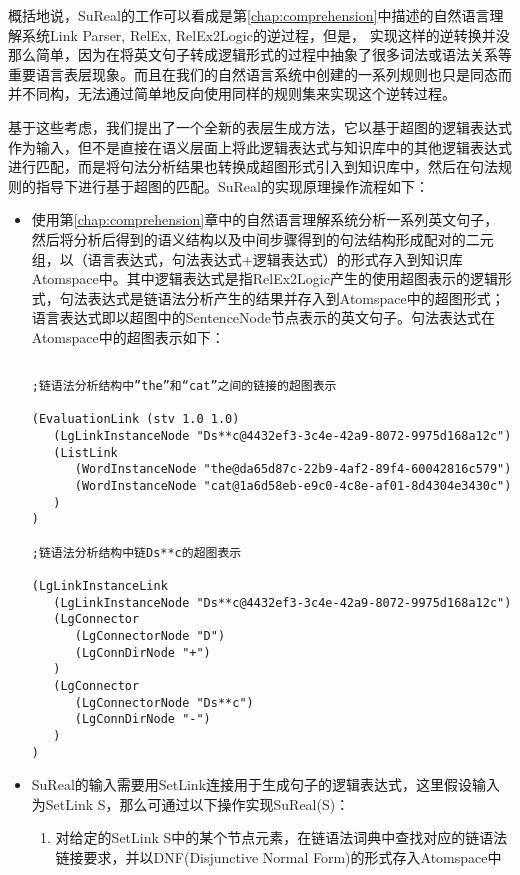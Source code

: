 概括地说，SuReal的工作可以看成是第\ref{chap:comprehension}中描述的自然语言理解系统Link Parser, RelEx, RelEx2Logic的逆过程，但是， 实现这样的逆转换并没那么简单，因为在将英文句子转成逻辑形式的过程中抽象了很多词法或语法关系等重要语言表层现象。而且在我们的自然语言系统中创建的一系列规则也只是同态而并不同构，无法通过简单地反向使用同样的规则集来实现这个逆转过程。

基于这些考虑，我们提出了一个全新的表层生成方法，它以基于超图的逻辑表达式作为输入，但不是直接在语义层面上将此逻辑表达式与知识库中的其他逻辑表达式进行匹配，而是将句法分析结果也转换成超图形式引入到知识库中，然后在句法规则的指导下进行基于超图的匹配。SuReal的实现原理操作流程如下：

\begin{itemize}
\item	使用第\ref{chap:comprehension}章中的自然语言理解系统分析一系列英文句子，然后将分析后得到的语义结构以及中间步骤得到的句法结构形成配对的二元组，以（语言表达式，句法表达式+逻辑表达式）的形式存入到知识库Atomspace中。其中逻辑表达式是指RelEx2Logic产生的使用超图表示的逻辑形式，句法表达式是链语法分析产生的结果并存入到Atomspace中的超图形式；语言表达式即以超图中的SentenceNode节点表示的英文句子。句法表达式在Atomspace中的超图表示如下：

\begin{verbatim}

;链语法分析结构中”the”和“cat”之间的链接的超图表示

(EvaluationLink (stv 1.0 1.0)
   (LgLinkInstanceNode "Ds**c@4432ef3-3c4e-42a9-8072-9975d168a12c")
   (ListLink
      (WordInstanceNode "the@da65d87c-22b9-4af2-89f4-60042816c579")
      (WordInstanceNode "cat@1a6d58eb-e9c0-4c8e-af01-8d4304e3430c")
   )
)

;链语法分析结构中链Ds**c的超图表示

(LgLinkInstanceLink
   (LgLinkInstanceNode "Ds**c@4432ef3-3c4e-42a9-8072-9975d168a12c")
   (LgConnector
      (LgConnectorNode "D")
      (LgConnDirNode "+")
   )
   (LgConnector
      (LgConnectorNode "Ds**c")
      (LgConnDirNode "-")
   )
)

\end{verbatim}

\item	SuReal的输入需要用SetLink连接用于生成句子的逻辑表达式，这里假设输入为SetLink S，那么可通过以下操作实现SuReal(S)：

\begin{enumerate}

\item 对给定的SetLink S中的某个节点元素，在链语法词典中查找对应的链语法链接要求，并以DNF(Disjunctive Normal Form)的形式存入Atomspace中


\end{enumerate}
\end{itemize}
